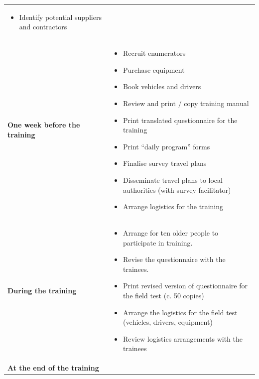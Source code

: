 \documentclass[12pt,a4paper]{book}
\providecommand{\tightlist}{%
  \setlength{\itemsep}{0pt}\setlength{\parskip}{0pt}}
\theoremstyle{definition}
\theoremstyle{definition}
\theoremstyle{definition}
\theoremstyle{remark}
\begin{document}
\begin{longtable}[]{@{}ll@{}}
\begin{minipage}[t]{0.48\columnwidth}
\begin{itemize}
  Begin sourcing equipment
\item
  Identify potential suppliers and contractors
\end{itemize}\strut
\end{minipage}\tabularnewline
\begin{minipage}[t]{0.48\columnwidth}\raggedright
\textbf{One week before the training}\strut
\end{minipage} & \begin{minipage}[t]{0.48\columnwidth}\raggedright
\begin{itemize}
\tightlist
\item
  Recruit enumerators
\item
  Purchase equipment
\item
  Book vehicles and drivers
\item
  Review and print / copy training manual
\item
  Print translated questionnaire for the training
\item
  Print ``daily program'' forms
\item
  Finalise survey travel plans
\item
  Disseminate travel plans to local authorities (with survey
  facilitator)
\item
  Arrange logistics for the training
\end{itemize}\strut
\end{minipage}\tabularnewline
\begin{minipage}[t]{0.48\columnwidth}\raggedright
\textbf{During the training}\strut
\end{minipage} & \begin{minipage}[t]{0.48\columnwidth}\raggedright
\begin{itemize}
\tightlist
\item
  Arrange for ten older people to participate in training.
\item
  Revise the questionnaire with the trainees.
\item
  Print revised version of questionnaire for the field test (c. 50
  copies)
\item
  Arrange the logistics for the field test (vehicles, drivers,
  equipment)
\item
  Review logistics arrangements with the trainees
\end{itemize}\strut
\end{minipage}\tabularnewline
\begin{minipage}[t]{0.48\columnwidth}\raggedright
\textbf{At the end of the training}\strut

\end{minipage}
\end{longtable}
\end{document}
